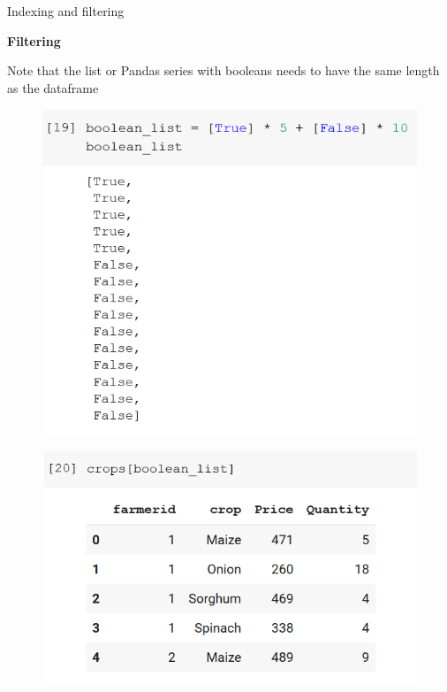 \documentclass[aspectratio=169]{beamer}
\begin{document}
\begin{frame}{Indexing and filtering}

	\textbf{Filtering}

	Note that the list or Pandas series with booleans needs to have the same length as the dataframe

	\begin{multicols}{2}

		\begin{figure}
			\centering
			\includegraphics[width=0.85\linewidth]{img/boolean_list.png}
		\end{figure}

		\begin{figure}
			\centering
			\includegraphics[width=\linewidth]{img/crops_filtered.png}
		\end{figure}

	\end{multicols}

\end{frame}
\end{document}
